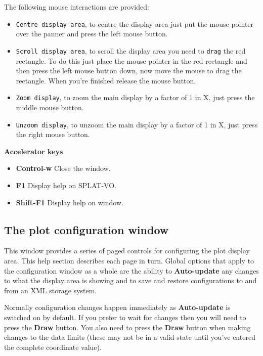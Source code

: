 \documentclass[twoside,11pt]{article}
\renewcommand{\_}{\texttt{\symbol{95}}}
\newcommand{\SPLAT}{\textsf{SPLAT-VO}}
\newcommand{\labelitem}[1]{\textbf{#1}}
\newcommand{\hitext}[1]{\texttt{#1}}
\newcommand{\subheading}[1]{\textbf{\large{#1}}}
\begin{document}
The following mouse interactions are provided:
\begin{itemize}

 \item \hitext{Centre display area}, to centre the display area just
 put the mouse pointer over the panner and press the left mouse
 button.

 \item \hitext{Scroll display area}, to scroll the display area you
 need to \hitext{drag} the red rectangle. To do this just place the
 mouse pointer in the red rectangle and then press the left mouse
 button down, now move the mouse to drag the rectangle. When you're
 finished release the mouse button.

 \item \hitext{Zoom display}, to zoom the main display by a factor of
 1 in X, just press the middle mouse button.

 \item \hitext{Unzoom display}, to unzoom the main display by a factor
 of 1 in X, just press the right mouse button.

\end{itemize}

\subheading{Accelerator keys}

\begin{itemize}
\item \labelitem{Control-w} Close the window.
\item \labelitem{F1} Display help on \SPLAT.
\item \labelitem{Shift-F1} Display help on window.
\end{itemize}

\newpage
\subsection{The plot configuration window}

This window provides a series of paged controls for configuring the
plot display area. This help section describes each page in
turn. Global options that apply to the configuration window as a whole
are the ability to \labelitem{Auto-update} any changes to what the
display area is showing and to save and restore configurations to and
from an XML storage system.

Normally configuration changes happen immediately as \labelitem{Auto-update}
is switched on by default. If you prefer to wait for changes then you will
need to press the \labelitem{Draw} button. You also need to press the
\labelitem{Draw} button when making changes to the data limits (these may not
be in a valid state until you've entered the complete coordinate value).
\end{document}
